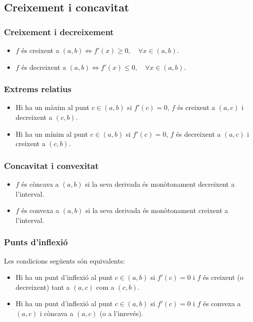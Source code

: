 \subsection{Creixement i concavitat}
\subsubsection*{Creixement i decreixement}
\begin{itemize}
    \item $f$ és creixent a $(a,b) \Leftrightarrow f'(x) \geq 0, \quad \forall x \in (a,b)$.
    \item $f$ és decreixent a $(a,b) \Leftrightarrow f'(x) \leq 0, \quad \forall x \in (a,b)$.
\end{itemize}
    
\subsubsection*{Extrems relatius}
\begin{itemize}
    \item Hi ha un màxim al punt $c \in (a,b)$ si $f'(c)=0$, $f$ és creixent a $(a,c)$ i decreixent a $(c,b)$.
    \item Hi ha un mínim al punt $c \in (a,b)$ si $f'(c)=0$, $f$ és decreixent a $(a,c)$ i creixent a $(c,b)$.
\end{itemize}

\subsubsection*{Concavitat i convexitat}
\begin{itemize}
    \item $f$ és còncava a $(a,b)$ si la seva derivada és monòtonament decreixent a l'interval.
    \item $f$ és convexa a $(a,b)$ si la seva derivada és monòtonament creixent a l'interval.
\end{itemize}

\subsubsection*{Punts d'inflexió}
Les condicions següents són equivalents:
\begin{itemize}
    \item Hi ha un punt d'inflexió al punt $c \in (a,b)$ si $f'(c)=0$ i $f$ és creixent (o decreixent) tant a $(a,c)$ com a $(c,b)$.
    \item Hi ha un punt d'inflexió al punt $c \in (a,b)$ si $f'(c)=0$ i $f$ és convexa a $(a,c)$ i còncava a $(a,c)$ (o a l'inrevés).
\end{itemize}


